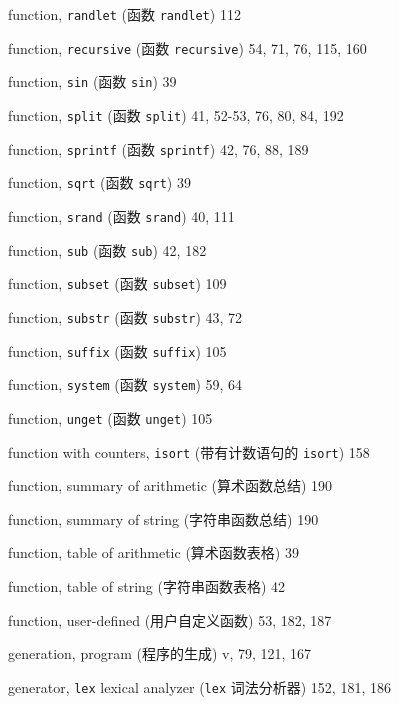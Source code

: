 \begin{multicols}{2}
\hangindent=2pc  function, \verb'randlet' (函数 \verb'randlet') 112

\hangindent=2pc  function, \verb'recursive' (函数 \verb'recursive')
54, 71, 76, 115, 160

\hangindent=2pc  function, \verb'sin' (函数 \verb'sin') 39

\hangindent=2pc  function, \verb'split' (函数 \verb'split')
41, 52-53, 76, 80, 84, 192

\hangindent=2pc  function, \verb'sprintf' (函数 \verb'sprintf')
42, 76, 88, 189

\hangindent=2pc  function, \verb'sqrt' (函数 \verb'sqrt') 39

\hangindent=2pc  function, \verb'srand' (函数 \verb'srand') 40, 111

\hangindent=2pc  function, \verb'sub' (函数 \verb'sub') 42, 182

\hangindent=2pc  function, \verb'subset' (函数 \verb'subset') 109

\hangindent=2pc  function, \verb'substr' (函数 \verb'substr') 43, 72

\hangindent=2pc  function, \verb'suffix' (函数 \verb'suffix') 105

\hangindent=2pc  function, \verb'system' (函数 \verb'system') 59, 64

\hangindent=2pc  function, \verb'unget' (函数 \verb'unget') 105

\hangindent=2pc  function with counters, \verb'isort'
(带有计数语句的 \verb'isort') 158

\hangindent=2pc  function, summary of arithmetic (算术函数总结) 190

\hangindent=2pc  function, summary of string (字符串函数总结) 190

\hangindent=2pc  function, table of arithmetic (算术函数表格) 39

\hangindent=2pc  function, table of string (字符串函数表格) 42

\hangindent=2pc  function, user-defined (用户自定义函数) 53, 182, 187

\hangindent=2pc  generation, program (程序的生成) v, 79, 121, 167

\hangindent=2pc  generator, \verb'lex' lexical analyzer
(\verb'lex' 词法分析器) 152, 181, 186


\end{multicols}
